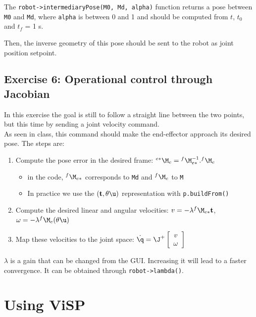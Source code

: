 \documentclass{ecnreport}
\begin{document}
The \texttt{robot->intermediaryPose(M0, Md, alpha)} function returns a pose between \texttt{M0} and \texttt{Md}, where \texttt{alpha} is between 0 and 1 and should be computed from $t$, $t_0$ and $t_f$ = 1 s.

Then, the inverse geometry of this pose should be sent to the robot as joint position setpoint.

\newpage
\subsection*{Exercise 6: Operational control through Jacobian}

In this exercise the goal is still to follow a straight line between the two points, but this time by sending a joint velocity command.\\

As seen in class, this command should make the end-effector approach its desired pose. The steps are:
\begin{enumerate}
	\item Compute the pose error in the desired frame: ${}^{e*}\M_e = {}^{f}\M_{e*}^{-1}.{}^{f}\M_e$
	\begin{itemize}
		\item in the code, ${}^{f}\M_{e*}$ corresponds to \texttt{Md} and ${}^{f}\M_e$ to \texttt{M} 
		\item In practice we use the $(\mathbf{t}, \theta\u)$ representation with \texttt{p.buildFrom()}
	\end{itemize}
	\item Compute the desired linear and angular velocities: $v = -\lambda{}^{f}\M_{e*}\mathbf{t}$, \quad $\omega = -\lambda{}^{f}\M_{e} (\theta\u)$
	\item Map these velocities to the joint space: $\dot\q = \J^+ \left[\begin{array}{c}v\\\omega\end{array}\right]$
\end{enumerate}
$\lambda$ is a gain that can be changed from the GUI. Increasing it will lead to a faster convergence. It can be obtained through \texttt{robot->lambda()}.



\appendix


\newpage

\section{Using ViSP}\label{visp}
\end{document}
